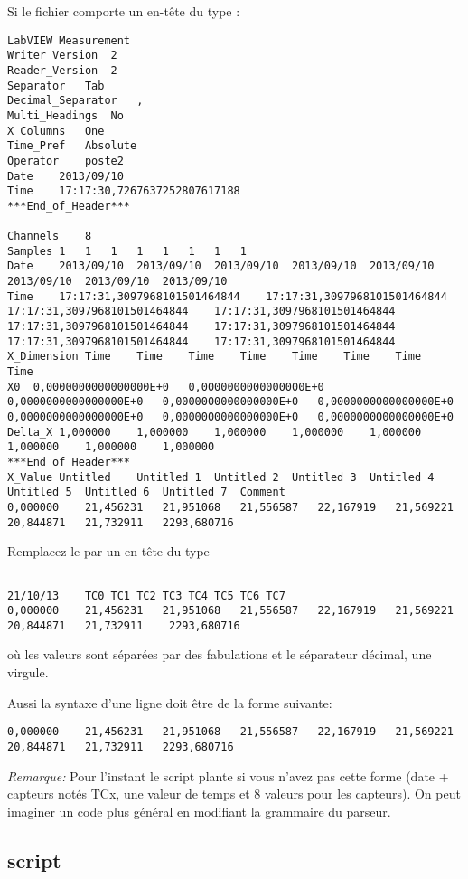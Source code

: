 \documentclass{MyReportClass}
\begin{document}
Si le fichier comporte un en-tête du type :
\begin{lstlisting}
LabVIEW Measurement	
Writer_Version	2	
Reader_Version	2	
Separator	Tab	
Decimal_Separator	,	
Multi_Headings	No	
X_Columns	One	
Time_Pref	Absolute	
Operator	poste2	
Date	2013/09/10	
Time	17:17:30,7267637252807617188	
***End_of_Header***		
	
Channels	8									
Samples	1	1	1	1	1	1	1	1		
Date	2013/09/10	2013/09/10	2013/09/10	2013/09/10	2013/09/10	2013/09/10	2013/09/10	2013/09/10		
Time	17:17:31,3097968101501464844	17:17:31,3097968101501464844	17:17:31,3097968101501464844	17:17:31,3097968101501464844	17:17:31,3097968101501464844	17:17:31,3097968101501464844	17:17:31,3097968101501464844	17:17:31,3097968101501464844		
X_Dimension	Time	Time	Time	Time	Time	Time	Time	Time		
X0	0,0000000000000000E+0	0,0000000000000000E+0	0,0000000000000000E+0	0,0000000000000000E+0	0,0000000000000000E+0	0,0000000000000000E+0	0,0000000000000000E+0	0,0000000000000000E+0		
Delta_X	1,000000	1,000000	1,000000	1,000000	1,000000	1,000000	1,000000	1,000000		
***End_of_Header***										
X_Value	Untitled	Untitled 1	Untitled 2	Untitled 3	Untitled 4	Untitled 5	Untitled 6	Untitled 7	Comment	
0,000000	21,456231	21,951068	21,556587	22,167919	21,569221	20,844871	21,732911 	2293,680716	

\end{lstlisting}

Remplacez le par un en-tête du type
\begin{lstlisting}

21/10/13	TC0	TC1	TC2	TC3	TC4	TC5	TC6	TC7	
0,000000	21,456231	21,951068	21,556587	22,167919	21,569221	20,844871	21,732911	 2293,680716	
\end{lstlisting}
 où les valeurs sont séparées par des fabulations et le séparateur décimal, une virgule.	
 
Aussi la syntaxe d'une ligne doit être de la forme suivante:
\begin{lstlisting}
0,000000	21,456231	21,951068	21,556587	22,167919	21,569221	20,844871	21,732911 	2293,680716	
\end{lstlisting}

\emph{Remarque:} Pour l'instant le script plante si vous n'avez pas cette forme (date + capteurs notés TCx, une valeur de temps et 8 valeurs pour les capteurs). On peut imaginer un code plus général en modifiant la grammaire du parseur.

\subsection{script}
\end{document}
